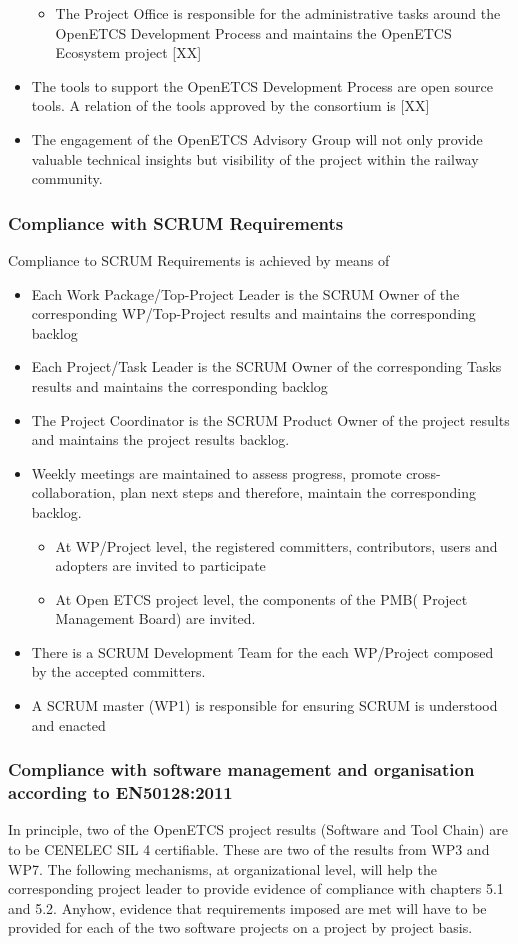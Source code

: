 \documentclass{template/openetcs_article}
\begin{document}
\begin{itemize}
\begin{itemize}
\item The Project Office is responsible for the administrative tasks around the OpenETCS Development Process and maintains the OpenETCS Ecosystem project [XX]
\end{itemize}
\item The tools to support the OpenETCS Development Process are open source tools. A relation of the tools approved by the consortium is [XX]
\item The engagement of the OpenETCS Advisory Group will not only provide valuable technical insights but visibility of the project within the railway community.
\end{itemize}

\subsubsection{Compliance with SCRUM Requirements}
Compliance to SCRUM Requirements is achieved by means of
\begin{itemize}
\item Each Work Package/Top-Project Leader is the SCRUM Owner of the corresponding WP/Top-Project results and maintains the corresponding backlog
\item Each Project/Task Leader is the SCRUM Owner of the corresponding Tasks results  and maintains the corresponding backlog
\item The Project Coordinator is the SCRUM Product Owner of the project results and maintains the project results backlog.
\item Weekly meetings are maintained to assess progress, promote cross-collaboration, plan next steps and therefore, maintain the corresponding backlog.
\begin{itemize}
\item At WP/Project level, the registered committers, contributors, users and adopters are invited to participate
\item At Open ETCS project level, the components of the PMB( Project Management Board) are invited.
\end{itemize} 
\item There is a SCRUM Development Team for the each WP/Project composed by the accepted committers.
\item A SCRUM master (WP1) is responsible for ensuring SCRUM is understood and enacted
\end{itemize}

\subsubsection{Compliance with software management and organisation according to EN50128:2011}
In principle, two of the OpenETCS project results (Software and Tool Chain) are to be CENELEC SIL 4 certifiable. These are two of the results from WP3 and WP7. The following mechanisms, at organizational level, will help the corresponding project leader to provide evidence of compliance with chapters 5.1 \citep{EN50128} and 5.2. Anyhow, evidence that requirements imposed are met will have to be provided for each of the two software projects on a project by project basis. 
\end{document}
